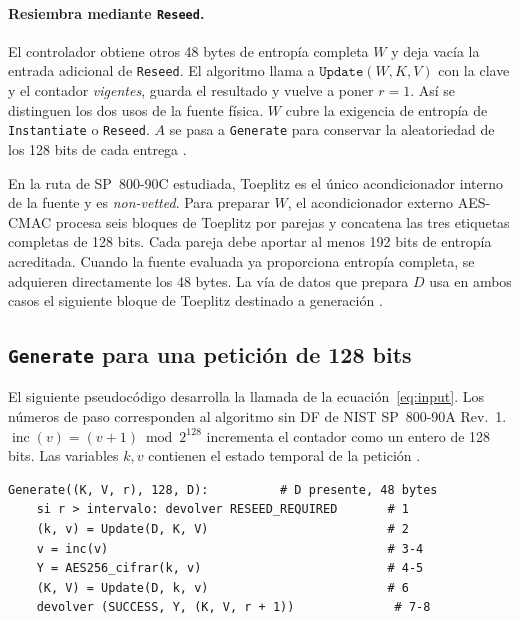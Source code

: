 \documentclass[11pt,a4paper]{article}
\begin{document}
\paragraph{Resiembra mediante \texttt{Reseed}.}
El controlador obtiene otros 48 bytes de entropía completa \(W\) y deja vacía la entrada adicional de \texttt{Reseed}. El algoritmo llama a \(\texttt{Update}(W,K,V)\) con la clave y el contador \emph{vigentes}, guarda el resultado y vuelve a poner \(r=1\). Así se distinguen los dos usos de la fuente física. \(W\) cubre la exigencia de entropía de \texttt{Instantiate} o \texttt{Reseed}. \(A\) se pasa a \texttt{Generate} para conservar la aleatoriedad de los 128 bits de cada entrega \cite[§§8.7.2 y 10.2.1.4.1]{nist90a}.

En la ruta de SP~800-90C estudiada, Toeplitz es el único acondicionador interno de la fuente y es \emph{non-vetted}. Para preparar \(W\), el acondicionador externo AES-CMAC procesa seis bloques de Toeplitz por parejas y concatena las tres etiquetas completas de 128 bits. Cada pareja debe aportar al menos 192 bits de entropía acreditada. Cuando la fuente evaluada ya proporciona entropía completa, se adquieren directamente los 48 bytes. La vía de datos que prepara \(D\) usa en ambos casos el siguiente bloque de Toeplitz destinado a generación \cite[§3.2.2.2]{nist90c}\cite{cmac}.

\subsection{\texttt{Generate} para una petición de 128 bits}
El siguiente pseudocódigo desarrolla la llamada de la ecuación~\eqref{eq:input}. Los números de paso corresponden al algoritmo sin DF de NIST SP~800-90A Rev.~1. \(\operatorname{inc}(v)=(v+1)\bmod 2^{128}\) incrementa el contador como un entero de 128 bits. Las variables \(k,v\) contienen el estado temporal de la petición \cite[§10.2.1.5.1, pp.~56--57]{nist90a}.

\par\noindent\begin{minipage}{\linewidth}\small
\begin{verbatim}
Generate((K, V, r), 128, D):          # D presente, 48 bytes
    si r > intervalo: devolver RESEED_REQUIRED       # 1
    (k, v) = Update(D, K, V)                         # 2
    v = inc(v)                                       # 3-4
    Y = AES256_cifrar(k, v)                          # 4-5
    (K, V) = Update(D, k, v)                         # 6
    devolver (SUCCESS, Y, (K, V, r + 1))              # 7-8
\end{verbatim}
\end{minipage}\par
\end{document}
